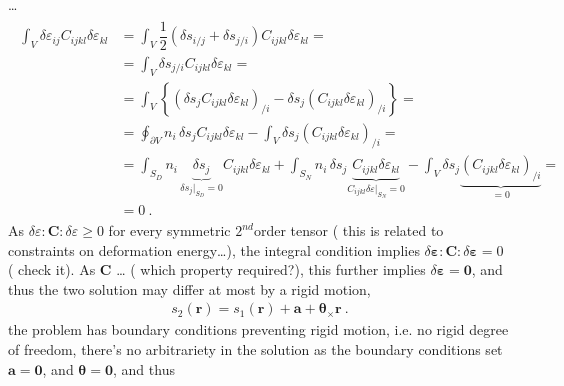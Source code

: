\documentclass[letterpaper,10pt,english]{jupyterBook}
\begin{document}
\sphinxAtStartPar
…
\begin{equation*}
\begin{split}\begin{aligned}
  \int_{V} \delta \varepsilon_{ij} C_{ijkl} \delta \varepsilon_{kl}
  & =  \int_{V} \dfrac{1}{2} \left( \delta s_{i/j} + \delta s_{j/i} \right) C_{ijkl} \delta \varepsilon_{kl} = \\
  & =  \int_{V} \delta s_{j/i} C_{ijkl} \delta \varepsilon_{kl} = \\
  & =  \int_{V} \left\{ \left( \delta s_{j} C_{ijkl} \delta \varepsilon_{kl} \right)_{/i} - \delta s_{j} \left( C_{ijkl} \delta \varepsilon_{kl} \right)_{/i} \right\} = \\
  & =  \oint_{\partial V} n_i \, \delta s_{j} C_{ijkl} \delta \varepsilon_{kl} - \int_V \delta s_{j} \left( C_{ijkl} \delta \varepsilon_{kl} \right)_{/i} = \\
  & =  \int_{S_D} n_i \, \underbrace{ \delta s_{j} }_{\delta s_j |_{S_D} = 0} C_{ijkl} \delta \varepsilon_{kl} + \int_{S_N} n_i \, \delta s_j \underbrace{ C_{ijkl} \delta \varepsilon_{kl} }_{ C_{ijkl} \delta \varepsilon |_{S_N} = 0} - \int_V \delta s_{j} \underbrace{ \left( C_{ijkl} \delta \varepsilon_{kl} \right)_{/i}}_{ = 0} = \\
  & = 0 \ .
\end{aligned}\end{split}
\end{equation*}
\sphinxAtStartPar
As \(\delta \varepsilon : \mathbf{C} : \delta \varepsilon \ge 0\) for every symmetric \(2^{nd}\)\sphinxhyphen{}order tensor ( this is related to constraints on deformation energy…), the integral condition implies \(\delta \boldsymbol\varepsilon : \mathbf{C} : \delta \boldsymbol\varepsilon = 0\) ( check it). As \(\mathbf{C}\) … ( which property required?), this further implies \(\delta \boldsymbol\varepsilon = \mathbf{0}\), and thus the two solution may differ at most by a rigid motion,
\begin{equation*}
\begin{split}s_2(\mathbf{r}) = s_1(\mathbf{r}) + \mathbf{a} + \boldsymbol\theta_\times \mathbf{r} \ .\end{split}
\end{equation*}
\sphinxAtStartPar
{} the problem has boundary conditions preventing rigid motion, i.e. no rigid degree of freedom, there’s no arbitrariety in the solution as the boundary conditions set \(\mathbf{a} = \mathbf{0}\), and \(\boldsymbol\theta = \mathbf{0}\), and thus
\end{document}
